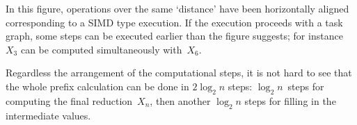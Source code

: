 In this figure, operations over the same `distance' have been
horizontally aligned corresponding to a \ac{SIMD} type execution.
If the execution proceeds with a task graph, some steps can be
executed earlier than the figure suggests; for instance $X_3$ can be
computed simultaneously with~$X_6$.

Regardless the arrangement of the computational steps,
it is not hard to see that the whole prefix calculation
can be done in $2\log_2n$ steps: $\log_2 n$~steps for 
computing the final reduction~$X_n$, then another $\log_2 n$
steps for filling in the intermediate values.
